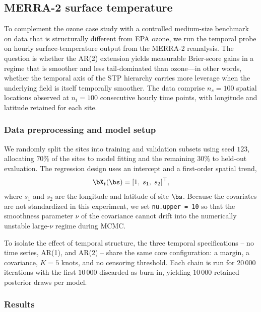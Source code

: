 \subsection{MERRA-2 surface temperature}\label{sec:data-merra2}

To complement the ozone case study with a controlled medium-size benchmark on data that is structurally different from EPA ozone, we run the temporal probe on hourly surface-temperature output from the MERRA-2 reanalysis.  The question is whether the AR(2) extension yields measurable Brier-score gains in a regime that is smoother and less tail-dominated than ozone---in other words, whether the temporal axis of the STP hierarchy carries more leverage when the underlying field is itself temporally smoother.  The data comprise $n_s = 100$ spatial locations observed at $n_t = 100$ consecutive hourly time points, with longitude and latitude retained for each site.

\subsubsection{Data preprocessing and model setup}

We randomly split the sites into training and validation subsets using seed $123$, allocating $70\%$ of the sites to model fitting and the remaining $30\%$ to held-out evaluation.  The regression design uses an intercept and a first-order spatial trend,
\begin{align}
  \bX_t(\bs) = [1,\; s_1,\; s_2]^\top,
\end{align}
where $s_1$ and $s_2$ are the longitude and latitude of site $\bs$.  Because the covariates are not standardized in this experiment, we set \texttt{nu.upper = 10} so that the smoothness parameter $\nu$ of the \Matern covariance cannot drift into the numerically unstable large-$\nu$ regime during MCMC.

To isolate the effect of temporal structure, the three temporal specifications -- no time series, AR(1), and AR(2) -- share the same core configuration: a \skewt margin, a \Matern covariance, $K=5$ knots, and no censoring threshold.  Each chain is run for $20\,000$ iterations with the first $10\,000$ discarded as burn-in, yielding $10\,000$ retained posterior draws per model.

\subsubsection{Results}

